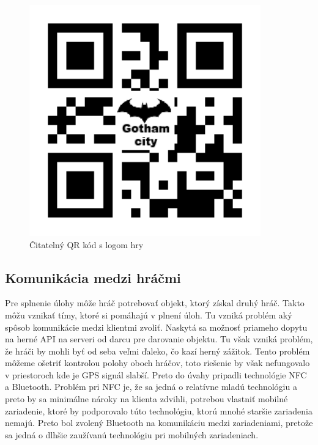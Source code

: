 \begin{figure}[h]
  \centering
  \includegraphics[height=10cm]{mainmatter/imgs/qrcode.png}
  \caption{Čitatelný QR kód s logom hry}
  \label{fig:qrcode}
\end{figure}


\subsection{Komunikácia medzi hráčmi}
Pre splnenie úlohy môže hráč potrebovať objekt, ktorý získal druhý hráč. Takto môžu vznikať tímy, ktoré si pomáhajú v plnení úloh. Tu vzniká problém aký spôsob komunikácie medzi klientmi zvoliť. Naskytá sa možnosť priameho dopytu na herné API na serveri od darcu pre darovanie objektu. Tu však vzniká problém, že hráči by mohli byť od seba veľmi ďaleko, čo kazí herný zážitok. Tento problém môžeme ošetriť kontrolou polohy oboch hráčov, toto riešenie by však nefungovalo v priestoroch kde je GPS signál slabší. Preto do úvahy pripadli technológie NFC a Bluetooth. Problém pri NFC je, že sa jedná o relatívne mladú technológiu a preto by sa minimálne nároky na klienta zdvihli, potrebou vlastniť mobilné zariadenie, ktoré by podporovalo túto technológiu, ktorú mnohé staršie zariadenia nemajú. Preto bol zvolený Bluetooth na komunikáciu medzi zariadeniami, pretože sa jedná o dlhšie zaužívanú technológiu pri mobilných zariadeniach.
